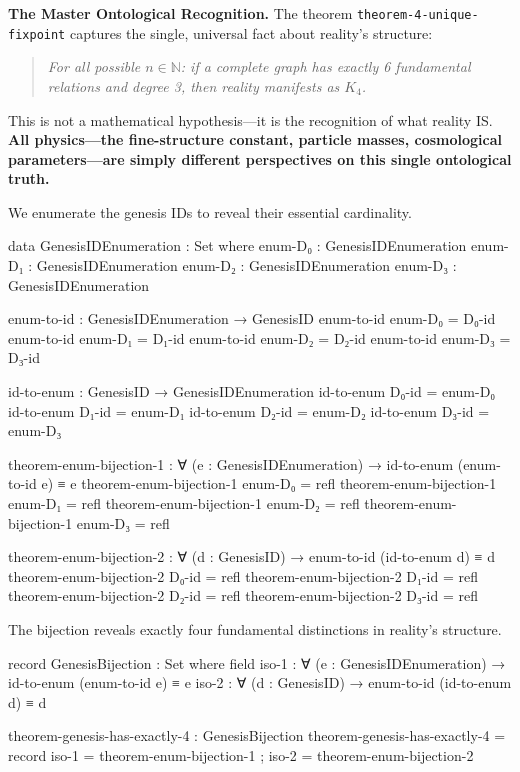 \documentclass[11pt,a4paper]{book}
\begin{document}
\textbf{The Master Ontological Recognition.} The theorem \texttt{theorem-4-unique-fixpoint} captures the single, universal fact about reality's structure:

\begin{quote}
\emph{For all possible $n \in \mathbb{N}$: if a complete graph has exactly 6 fundamental relations and degree 3, then reality manifests as $K_4$.}
\end{quote}

This is not a mathematical hypothesis—it is the recognition of what reality IS. \textbf{All physics—the fine-structure constant, particle masses, cosmological parameters—are simply different perspectives on this single ontological truth.}

We enumerate the genesis IDs to reveal their essential cardinality.

\begin{code}
data GenesisIDEnumeration : Set where
  enum-D₀ : GenesisIDEnumeration
  enum-D₁ : GenesisIDEnumeration
  enum-D₂ : GenesisIDEnumeration
  enum-D₃ : GenesisIDEnumeration

enum-to-id : GenesisIDEnumeration → GenesisID
enum-to-id enum-D₀ = D₀-id
enum-to-id enum-D₁ = D₁-id
enum-to-id enum-D₂ = D₂-id
enum-to-id enum-D₃ = D₃-id

id-to-enum : GenesisID → GenesisIDEnumeration
id-to-enum D₀-id = enum-D₀
id-to-enum D₁-id = enum-D₁
id-to-enum D₂-id = enum-D₂
id-to-enum D₃-id = enum-D₃

theorem-enum-bijection-1 : ∀ (e : GenesisIDEnumeration) → id-to-enum (enum-to-id e) ≡ e
theorem-enum-bijection-1 enum-D₀ = refl
theorem-enum-bijection-1 enum-D₁ = refl
theorem-enum-bijection-1 enum-D₂ = refl
theorem-enum-bijection-1 enum-D₃ = refl

theorem-enum-bijection-2 : ∀ (d : GenesisID) → enum-to-id (id-to-enum d) ≡ d
theorem-enum-bijection-2 D₀-id = refl
theorem-enum-bijection-2 D₁-id = refl
theorem-enum-bijection-2 D₂-id = refl
theorem-enum-bijection-2 D₃-id = refl

\end{code}

The bijection reveals exactly four fundamental distinctions in reality's structure.

\begin{code}
record GenesisBijection : Set where
  field
    iso-1 : ∀ (e : GenesisIDEnumeration) → id-to-enum (enum-to-id e) ≡ e
    iso-2 : ∀ (d : GenesisID) → enum-to-id (id-to-enum d) ≡ d

theorem-genesis-has-exactly-4 : GenesisBijection
theorem-genesis-has-exactly-4 = record
  { iso-1 = theorem-enum-bijection-1
  ; iso-2 = theorem-enum-bijection-2
  }

\end{code}
\end{document}
